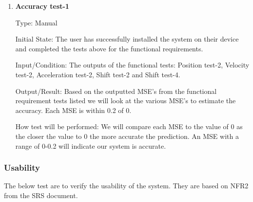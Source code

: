\documentclass[12pt, titlepage]{article}
\begin{document}
\begin{enumerate}
  \item {} \hypertarget{Accuracy test-1}{\textbf{Accuracy test-1}} \label{Accuracy test-1}


Type: Manual
					
Initial State: The user has successfully installed the system on their device and completed the tests above for the functional requirements.
					
Input/Condition: The outputs of the functional tests: Position test-2, Velocity test-2, Acceleration test-2, Shift test-2 and Shift test-4. 
					
Output/Result: Based on the outputted MSE's from the functional requirement tests listed we will look at the various MSE's to estimate the accuracy. 
Each MSE is within 0.2 of 0.
					
How test will be performed: We will compare each MSE to the value of 0 as the closer the value to 0 the more accurate the prediction. An MSE with a range of 0-0.2 will indicate our system is accurate.

\end{enumerate}

\subsubsection{Usability}

The below test are to verify the usability of the system.
They are based on NFR2 from the SRS document.
\end{document}
